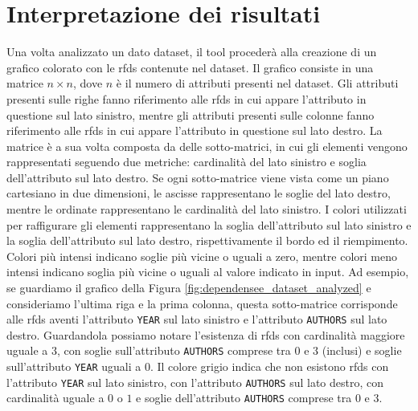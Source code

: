 \section{Interpretazione dei risultati}
Una volta analizzato un dato dataset, il tool proceder\`{a} alla creazione di un grafico colorato con le \acrlong{rfds} contenute nel dataset. Il grafico consiste in una matrice $n\times n$, dove $n$ \`{e} il numero di attributi presenti nel dataset. Gli attributi presenti sulle righe fanno riferimento alle \acrshort{rfds} in cui appare l'attributo in questione sul lato sinistro, mentre gli attributi presenti sulle colonne fanno riferimento alle \acrshort{rfds} in cui appare l'attributo in questione sul lato destro. La matrice \`{e} a sua volta composta da delle sotto-matrici, in cui gli elementi vengono rappresentati seguendo due metriche: cardinalit\`{a} del lato sinistro e soglia dell'attributo sul lato destro. Se ogni sotto-matrice viene vista come un piano cartesiano in due dimensioni, le ascisse rappresentano le soglie del lato destro, mentre le ordinate rappresentano le cardinalit\`{a} del lato sinistro. I colori utilizzati per raffigurare gli elementi rappresentano la soglia dell'attributo sul lato sinistro e la soglia dell'attributo sul lato destro, rispettivamente il bordo ed il riempimento. Colori pi\`{u} intensi indicano soglie pi\`{u} vicine o uguali a zero, mentre colori meno intensi indicano soglia pi\`{u} vicine o uguali al valore indicato in input. Ad esempio, se guardiamo il grafico della Figura \ref{fig:dependensee_dataset_analyzed} e consideriamo l'ultima riga e la prima colonna, questa sotto-matrice corrisponde alle \acrshort{rfds} aventi l'attributo \texttt{YEAR} sul lato sinistro e l'attributo \texttt{AUTHORS} sul lato destro. Guardandola possiamo notare l'esistenza di \acrshort{rfds} con cardinalit\`{a} maggiore uguale a $3$, con soglie sull'attributo \texttt{AUTHORS} comprese tra $0$ e $3$ (inclusi) e soglie sull'attributo \texttt{YEAR} uguali a $0$. Il colore grigio indica che non esistono \acrshort{rfds} con l'attributo \texttt{YEAR} sul lato sinistro, con l'attributo \texttt{AUTHORS} sul lato destro, con cardinalit\`{a} uguale a $0$ o $1$ e soglie dell'attributo \texttt{AUTHORS} comprese tra $0$ e $3$.